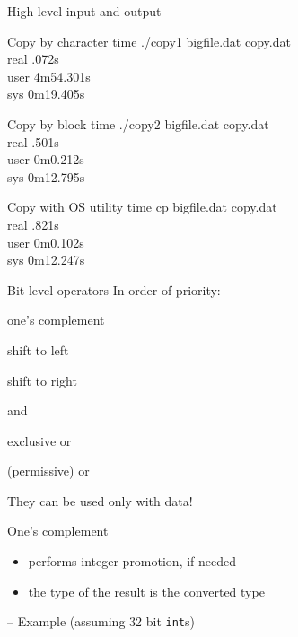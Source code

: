 \documentclass[usenames,dvipsnames,aspectratio=169]{beamer}
\begin{document}
\begin{frame}{High-level input and output}
  \footnotesize
  \begin{alertblock}{Copy by character}
time ./copy1 bigfile.dat copy.dat\\

real    .072s\\
user    4m54.301s\\
sys     0m19.405s\\  
  \end{alertblock}
  \begin{block}{Copy by block}
time ./copy2 bigfile.dat copy.dat\\

real    .501s\\
user    0m0.212s\\
sys     0m12.795s\\
  \end{block}
  \begin{block}{Copy with OS utility}
time cp bigfile.dat copy.dat\\

real    .821s\\
user    0m0.102s\\
sys     0m12.247s
  \end{block}
\end{frame}

\begin{frame}{Bit-level operators}
  In order of priority:
  \begin{description}[mmm]
    \item[\textasciitilde] one's complement
    \item[<{<}] shift to left
    \item[>{>}] shift to right
    \item[\&] and
    \item[\textasciicircum] exclusive or
    \item[|] (permissive) or
  \end{description}
  They can be used only with  data!
\end{frame}

\begin{frame}{One's complement}
  \begin{itemize}
    \item performs integer promotion, if needed
    \item the type of the result is the converted type
  \end{itemize}
  \small
  \begin{exampleblock}{ -- Example (assuming 32 bit \texttt{int}s)}
    
  \end{exampleblock}
\end{frame}
\end{document}
